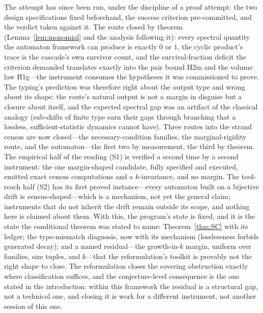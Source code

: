 The attempt has since been run, under the discipline of a proof
attempt: the two design specifications fixed beforehand, the success
criterion pre-committed, and the verdict taken against it. The route
closed by theorem (Lemma~\ref{lem:monomial} and the analysis following
it): every spectral quantity the automaton framework can produce is
exactly $0$ or $1$, the cyclic product's trace is the cascade's own
survivor count, and the survival-fraction deficit the criterion
demanded translates exactly into the pair bound H2m and the volume law
H1g---the instrument consumes the hypotheses it was commissioned to
prove. The typing's prediction was therefore right about the output
type and wrong about its shape: the route's natural output is not a
margin in disguise but a closure about itself, and the expected
spectral gap was an artifact of the classical analogy (sub-shifts of
finite type earn their gaps through branching that a lossless,
sufficient-statistic dynamics cannot have). Three routes into the
strand census are now closed---the necessary-condition families, the
marginal-rigidity route, and the automaton---the first two by
measurement, the third by theorem. The empirical half of the reading
(S1) is verified a second time by a second instrument: the one
margin-shaped candidate, fully specified and executed, emitted exact
census computations and a $k$-invariance, and no margin. The
tool-reach half (S2) has its first proved instance---every automaton
built on a bijective drift is census-shaped---which is a mechanism,
not yet the general claim; instruments that do not inherit the drift
remain outside its scope, and nothing here is claimed about them. With
this, the program's state is fixed, and it is the state the
conditional theorem was stated to name: Theorem~\ref{thm:SC} with its
ledger; the type-mismatch diagnosis, now with its mechanism
(losslessness forbids generated decay); and a named residual---the
growth-in-$k$ margin, uniform over families, size tuples, and
$k$---that the reformulation's toolkit is provably not the right shape
to close. The reformulation closes the covering obstruction exactly
where classification suffices, and the conjecture-level consequence is
the one stated in the introduction: within this framework the residual
is a structural gap, not a technical one, and closing it is work for a
different instrument, not another session of this one.

